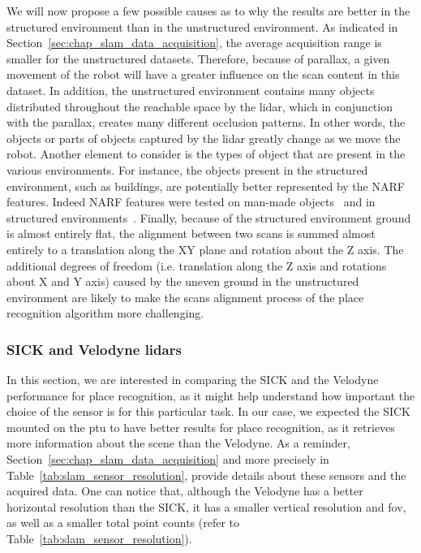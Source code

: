 We will now propose a few possible causes as to why the results are better in the structured environment than in the unstructured environment. As indicated in Section~\ref{sec:chap_slam_data_acquisition}, the average acquisition range is smaller for the unstructured datasets. Therefore, because of parallax, a given movement of the robot will have a greater influence on the scan content in this dataset. In addition, the unstructured environment contains many objects distributed throughout the reachable space by the \gls*{lidar}, which in conjunction with the parallax, creates many different occlusion patterns. In other words, the objects or parts of objects captured by the \gls*{lidar} greatly change as we move the robot. Another element to consider is the types of object that are present in the various environments. For instance, the objects present in the structured environment, such as buildings, are potentially better represented by the NARF features. Indeed NARF features were tested on man-made objects~\cite{Steder2011a} and in structured environments~\cite{Steder2010, Steder2011b}. Finally, because of the structured environment ground is almost entirely flat, the alignment between two scans is summed almost entirely to a translation along the XY plane and rotation about the Z axis. The additional degrees of freedom (i.e. translation along the Z axis and rotations about X and Y axis) caused by the uneven ground in the unstructured environment are likely to make the scans alignment process of the place recognition algorithm more challenging. 


\subsubsection{SICK and Velodyne \gls*{lidar}s}
\label{ssec:chap_slam_sick_vs_velodyne}

In this section, we are interested in comparing the SICK and the Velodyne performance for place recognition, as it might help understand how important the choice of the sensor is for this particular task. In our case, we expected the SICK mounted on the \gls*{ptu} to have better results for place recognition, as it retrieves more information about the scene than the Velodyne. As a reminder, Section~\ref{sec:chap_slam_data_acquisition} and more precisely in Table~\ref{tab:slam_sensor_resolution}, provide details about these sensors and the acquired data. One can notice that, although the Velodyne has a better horizontal resolution than the SICK, it has a smaller vertical resolution and \gls*{fov}, as well as a smaller total point counts (refer to Table~\ref{tab:slam_sensor_resolution}). 

